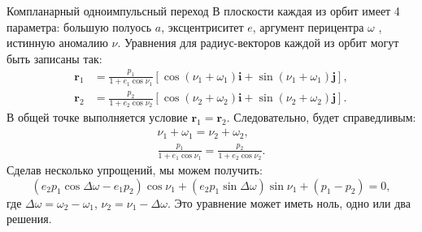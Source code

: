 \documentclass[9pt]{beamer}
\begin{document}
\begin{frame}{Компланарный одноимпульсный переход}
В плоскости каждая из орбит имеет 4 параметра: большую полуось $a$, эксцентриситет $e$, аргумент перицентра $\omega$ , истинную аномалию $\nu$. Уравнения для радиус-векторов каждой из орбит могут быть записаны так:
\begin{align*}
    \textbf{r}_1 &= \frac{p_1}{1 + e_1 \cos \nu_1} \left[ \cos (\nu_1 + \omega_1) \textbf{i} + \sin (\nu_1 + \omega_1) \textbf{j} \right], \\
    \textbf{r}_2 &= \frac{p_2}{1 + e_2 \cos \nu_2} \left[ \cos (\nu_2 + \omega_2) \textbf{i} + \sin (\nu_2 + \omega_2) \textbf{j} \right].
\end{align*}
В общей точке выполняется условие $\textbf{r}_1 = \textbf{r}_2$. Следовательно, будет справедливым:
\begin{gather*}
    \nu_1 + \omega_1 = \nu_2 + \omega_2, \\
    \frac{p_1}{1 + e_1 \cos \nu_1} = \frac{p_2}{1 + e_2 \cos \nu_2}.
\end{gather*}
Сделав несколько упрощений, мы можем получить:
\begin{equation*}
    (e_2 p_1 \cos \Delta \omega - e_1 p_2) \cos \nu_1 + (e_2 p_1 \sin \Delta \omega) \sin \nu_1 + (p_1 - p_2) = 0,
\end{equation*}
где $\Delta \omega = \omega_2 - \omega_1$, $\nu_2 = \nu_1 - \Delta \omega$. Это уравнение может иметь ноль, одно или два решения.
\end{frame}
\end{document}
